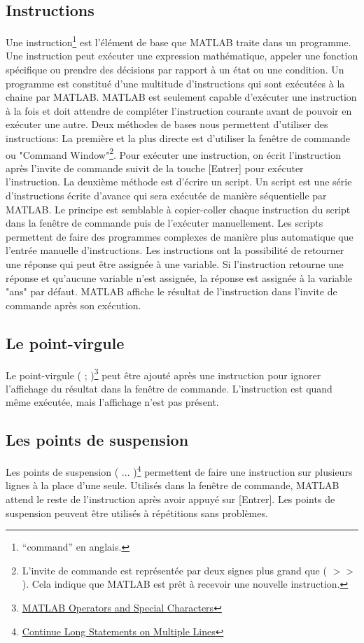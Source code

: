 \documentclass{tufte-handout}
\begin{document}
\subsection{Instructions}
Une instruction\footnote{“command” en anglais.} est l'élément de base que MATLAB traite dans un programme. Une instruction peut exécuter une expression mathématique, appeler une fonction spécifique ou prendre des décisions par rapport à un état ou une condition.
Un programme est constitué d'une multitude d'instructions qui sont exécutées à la chaine par MATLAB. MATLAB est seulement capable d'exécuter une instruction à la fois et doit attendre de compléter l'instruction courante avant de pouvoir en exécuter une autre.
Deux méthodes de bases nous permettent d'utiliser des instructions:
La première et la plus directe est d'utiliser la fenêtre de commande ou "Command Window"\footnote{L'invite de commande est représentée par deux signes plus grand que ( $>$$>$ ). Cela indique que MATLAB est prêt à recevoir une nouvelle instruction.}. Pour exécuter une instruction, on écrit l'instruction après l'invite de commande suivit de la touche [Entrer] pour exécuter l'instruction.
La deuxième méthode est d'écrire un script. Un script est une série d'instructions écrite d'avance qui sera exécutée de manière séquentielle par MATLAB. Le principe est semblable à copier-coller chaque instruction du script dans la fenêtre de commande puis de l'exécuter manuellement. Les scripts permettent de faire des programmes complexes de manière plus automatique que l'entrée manuelle d'instructions.
Les instructions ont la possibilité de retourner une réponse qui peut être assignée à une variable. Si l'instruction retourne une réponse et qu'aucune variable n'est assignée, la réponse est assignée à la variable "ans" par défaut.
MATLAB affiche le résultat de l'instruction dans l'invite de commande après son exécution.

\subsection{Le point-virgule}
Le point-virgule ( ; )\footnote{\href{https://www.mathworks.com/help/matlab/matlab_prog/matlab-operators-and-special-characters.html}{MATLAB Operators and Special Characters}} peut être ajouté après une instruction pour ignorer l'affichage du résultat dans la fenêtre de commande. L'instruction est quand même exécutée, mais l'affichage n'est pas présent.
\subsection{Les points de suspension}
Les points de suspension ( ... )\footnote{\href{https://www.mathworks.com/help/matlab/matlab_prog/continue-long-statements-on-multiple-lines.html}{Continue Long Statements on Multiple Lines}} permettent de faire une instruction sur plusieurs lignes à la place d'une seule. Utilisés dans la fenêtre de commande, MATLAB attend le reste de l'instruction après avoir appuyé sur [Entrer]. Les points de suspension peuvent être utilisés à répétitions sans problèmes.
\end{document}
